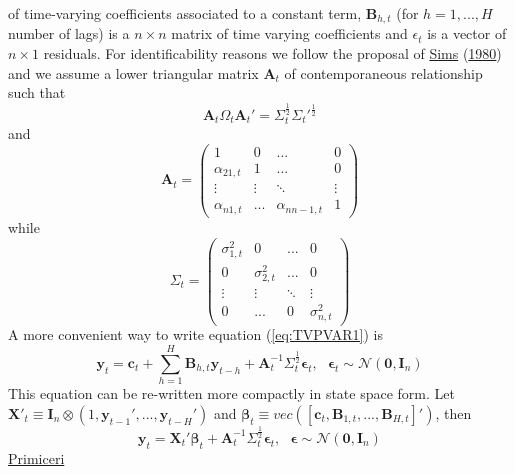 \documentclass[
  12pt,
]{book}
\theoremstyle{break}
\theoremstyle{nonumberplain}
\begin{document}
of time-varying coefficients associated to a constant term,
\(\boldsymbol{B}_{h,t}\) (for \(h=1,...,H\) number of lags) is a
\(n \times n\) matrix of time varying coefficients and \(\epsilon_{t}\)
is a vector of \(n \times 1\) residuals. For identificability reasons we
follow the proposal of \protect\hyperlink{ref-SIMS_1980}{Sims}
(\protect\hyperlink{ref-SIMS_1980}{1980}) and we assume a lower
triangular matrix \(\boldsymbol{A}_{t}\) of contemporaneous relationship
such that \begin{equation*}
\boldsymbol{A}_{t}\Omega_{t}\boldsymbol{A}_{t}'=\Sigma_{t}^{\frac{1}{2}}\Sigma_{t}'^{\frac{1}{2}}
\end{equation*} and \[ \boldsymbol A_{t} = \begin{pmatrix}
  1 & 0 & ... & 0 \\
  \alpha_{2 1,t} & 1 & ... & 0 \\
  \vdots  & \vdots  & \ddots & \vdots \\
  \alpha_{n1,t} & ... & \alpha_{n n-1,t} & 1
  \end{pmatrix}\] while \[ \Sigma_{t} = \begin{pmatrix}
  \sigma^{2}_{1,t} & 0 & ... & 0 \\
  0 & \sigma^{2}_{2,t} & ... & 0 \\
  \vdots  & \vdots  & \ddots & \vdots \\
  0 & ... & 0 & \sigma^{2}_{n,t}
  \end{pmatrix}\] A more convenient way to write equation
(\ref{eq:TVPVAR1}) is \begin{equation*}
\boldsymbol{y}_{t}=\boldsymbol{c}_{t}+\sum_{h=1}^{H}\boldsymbol{B}_{h,t}\boldsymbol{y}_{t-h}+\boldsymbol{A}^{-1}_{t}\Sigma_{t}^{\frac{1}{2}}\boldsymbol{\epsilon}_{t}, \ \ \ \boldsymbol{\epsilon}_{t}\sim\mathcal{N}(\boldsymbol{0},\boldsymbol{I}_{n})
\end{equation*} This equation can be re-written more compactly in state
space form. Let
\(\boldsymbol{X}'_{t}\equiv\boldsymbol{I}_{n}\otimes (1,\boldsymbol{y}_{t-1}',...,\boldsymbol{y}_{t-H}')\)
and
\(\boldsymbol{\beta}_{t}\equiv vec([\boldsymbol{c}_t,\boldsymbol{B}_{1,t},...,\boldsymbol{B}_{H,t}]')\),
then \begin{equation}\label{eq:ssmtvp}
\boldsymbol{y}_{t}=\boldsymbol{X}_{t}'\boldsymbol{\beta}_{t}+\boldsymbol{A}_{t}^{-1}\Sigma_{t}^{\frac{1}{2}}\boldsymbol{\epsilon}_{t}, \ \ \ \boldsymbol{\epsilon}\sim\mathcal{N}(\boldsymbol{0},\boldsymbol{I}_{n})
\end{equation} \protect\hyperlink{ref-Primicieri_2005}{Primiceri}
\end{document}
